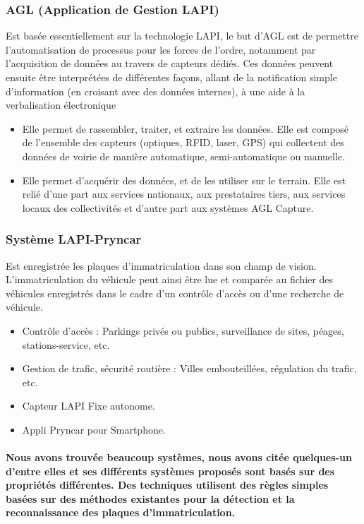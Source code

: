 \documentclass[11pt]{report}
\begin{document}
\subsubsection{AGL (Application de Gestion LAPI)}
Est basée essentiellement sur la technologie LAPI, le but d’AGL est de
permettre l’automatisation de processus pour les forces de l’ordre, notamment par
l’acquisition de données au travers de capteurs dédiés. Ces données peuvent ensuite
être interprétées de différentes façons, allant de la notification simple d’information
(en croisant avec des données internes), à une aide à la verbalisation électronique
\begin{itemize}
\item Elle permet de rassembler, traiter, et extraire les données. Elle est composé de
l’ensemble des capteurs (optiques, RFID, laser, GPS) qui collectent des données de
voirie de manière automatique, semi-automatique ou manuelle.
\item Elle permet d’acquérir des données, et de les utiliser sur le terrain. Elle est relié
d’une part aux services nationaux, aux prestataires tiers, aux services locaux des
collectivités et d’autre part aux systèmes AGL Capture.
\end{itemize}

\subsubsection{Système LAPI-Pryncar}
Est enregistrée les plaques d’immatriculation dans son champ de vision.
L’immatriculation du véhicule peut ainsi être lue et comparée au fichier des véhicules
enregistrés dans le cadre d’un contrôle d’accès ou d’une recherche de véhicule.
\begin{itemize}
\item Contrôle d’accès : Parkings privés ou publics, surveillance de sites,
péages, stations-service, etc.
\item Gestion de trafic, sécurité routière : Villes embouteillées, régulation du
trafic, etc.
\item Capteur LAPI Fixe autonome.
\item Appli Pryncar pour Smartphone.
\end{itemize}


\paragraph{Nous avons trouvée beaucoup systèmes, nous avons citée quelques-un d’entre
	elles et ses différents systèmes proposés sont basés sur des propriétés différentes. Des
	techniques utilisent des règles simples basées sur des méthodes existantes pour la
	détection et la reconnaissance des plaques d’immatriculation.}
\end{document}
